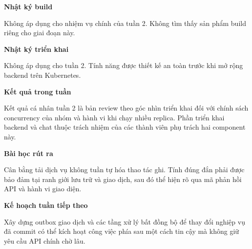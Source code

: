 \begin{Shaded}
\begin{Highlighting}[]
 
 
\end{Highlighting}
\end{Shaded}

\vspace{0.5em}\noindent\textbf{Nhật ký build}\par

Không áp dụng cho nhiệm vụ chính của tuần 2. Không tìm thấy sản phẩm
build riêng cho giai đoạn này.

\vspace{0.5em}\noindent\textbf{Nhật ký triển
khai}\par

Không áp dụng cho tuần 2. Tính năng được thiết kế an toàn trước khi mở
rộng backend trên Kubernetes.

\vspace{0.5em}\noindent\textbf{Kết quả trong tuần}\par

Kết quả cá nhân tuần 2 là bản review theo góc nhìn triển khai đối với
chính sách concurrency của nhóm và hành vi khi chạy nhiều replica. Phần
triển khai backend và chat thuộc trách nhiệm của các thành viên phụ
trách hai component này.

\vspace{0.5em}\noindent\textbf{Bài học rút ra}\par

Cân bằng tải dịch vụ không tuần tự hóa thao tác ghi. Tính đúng đắn phải
được bảo đảm tại ranh giới lưu trữ và giao dịch, sau đó thể hiện rõ qua
mã phản hồi API và hành vi giao diện.

\vspace{0.5em}\noindent\textbf{Kế hoạch tuần tiếp
theo}\par

Xây dựng outbox giao dịch và các tầng xử lý bất đồng bộ để thay đổi
nghiệp vụ đã commit có thể kích hoạt công việc phía sau một cách tin cậy
mà không giữ yêu cầu API chính chờ lâu.
